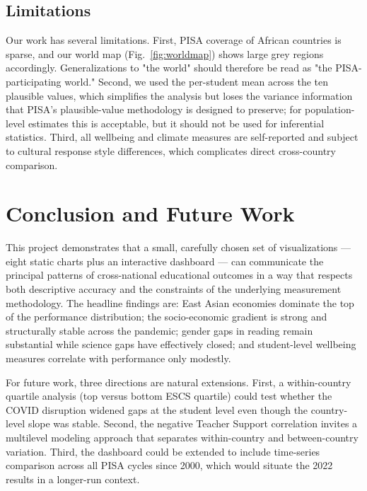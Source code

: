 \documentclass[conference]{IEEEtran}
\begin{document}
\subsection{Limitations}

Our work has several limitations. First, PISA coverage of African countries is sparse, and our world map (Fig.~\ref{fig:worldmap}) shows large grey regions accordingly. Generalizations to "the world" should therefore be read as "the PISA-participating world." Second, we used the per-student mean across the ten plausible values, which simplifies the analysis but loses the variance information that PISA's plausible-value methodology is designed to preserve; for population-level estimates this is acceptable, but it should not be used for inferential statistics. Third, all wellbeing and climate measures are self-reported and subject to cultural response style differences, which complicates direct cross-country comparison.

\section{Conclusion and Future Work}
\label{sec:conclusion}

This project demonstrates that a small, carefully chosen set of visualizations --- eight static charts plus an interactive dashboard --- can communicate the principal patterns of cross-national educational outcomes in a way that respects both descriptive accuracy and the constraints of the underlying measurement methodology. The headline findings are: East Asian economies dominate the top of the performance distribution; the socio-economic gradient is strong and structurally stable across the pandemic; gender gaps in reading remain substantial while science gaps have effectively closed; and student-level wellbeing measures correlate with performance only modestly.

For future work, three directions are natural extensions. First, a within-country quartile analysis (top versus bottom ESCS quartile) could test whether the COVID disruption widened gaps at the student level even though the country-level slope was stable. Second, the negative Teacher Support correlation invites a multilevel modeling approach that separates within-country and between-country variation. Third, the dashboard could be extended to include time-series comparison across all PISA cycles since 2000, which would situate the 2022 results in a longer-run context.
\end{document}
